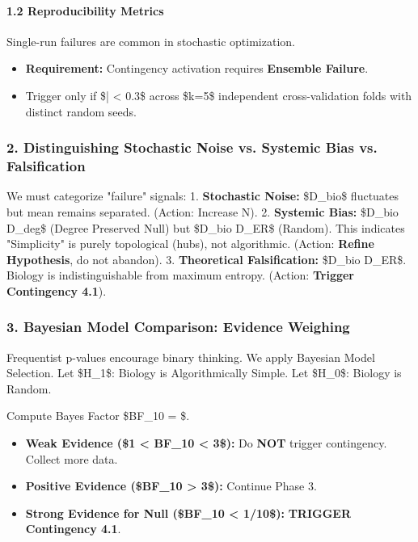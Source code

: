 \documentclass{article}
\begin{document}
\paragraph{1.2 Reproducibility Metrics}
Single-run failures are common in stochastic optimization.
\begin{itemize}
\item   \textbf{Requirement:} Contingency activation requires \textbf{Ensemble Failure}.
\item   Trigger only if \$\bar{\rho} < 0.3\$ across \$k=5\$ independent cross-validation folds with distinct random seeds.
\end{itemize}

\subsubsection{2. Distinguishing Stochastic Noise vs. Systemic Bias vs. Falsification}

We must categorize "failure" signals:
1.  \textbf{Stochastic Noise:} \$D\_{bio}\$ fluctuates but mean remains separated. (Action: Increase N).
2.  \textbf{Systemic Bias:} \$D\_{bio} \approx D\_{deg}\$ (Degree Preserved Null) but \$D\_{bio} \ll D\_{ER}\$ (Random). This indicates "Simplicity" is purely topological (hubs), not algorithmic. (Action: \textbf{Refine Hypothesis}, do not abandon).
3.  \textbf{Theoretical Falsification:} \$D\_{bio} \approx D\_{ER}\$. Biology is indistinguishable from maximum entropy. (Action: \textbf{Trigger Contingency 4.1}).

\subsubsection{3. Bayesian Model Comparison: Evidence Weighing}

Frequentist p-values encourage binary thinking. We apply Bayesian Model Selection.
Let \$H\_1\$: Biology is Algorithmically Simple.
Let \$H\_0\$: Biology is Random.

Compute Bayes Factor \$BF\_{10} = \$.

\begin{itemize}
\item   \textbf{Weak Evidence (\$1 < BF\_{10} < 3\$):} Do \textbf{NOT} trigger contingency. Collect more data.
\item   \textbf{Positive Evidence (\$BF\_{10} > 3\$):} Continue Phase 3.
\item   \textbf{Strong Evidence for Null (\$BF\_{10} < 1/10\$):} \textbf{TRIGGER Contingency 4.1}.
\end{itemize}
\end{document}
